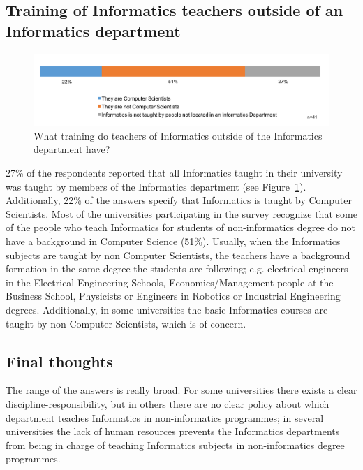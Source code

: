 \subsection{Training of Informatics teachers outside of an Informatics department}

\begin{figure}[h]
\includegraphics[width = \linewidth]{charts/2d.png}
\caption{What training do teachers of Informatics outside of the Informatics department have?}
\label{sect3:whoteaches}
\end{figure}
27\% of the respondents reported that all Informatics taught in their university was taught by members of the Informatics department (see Figure~\ref{sect3:whoteaches}).
Additionally, 22\% of the answers specify that Informatics is taught by Computer Scientists. 
Most of the universities participating in the survey recognize that some of the people who teach Informatics for students of non-informatics degree do not have a background in Computer Science (51\%). Usually, when the Informatics subjects are  taught by non Computer Scientists, the teachers have a background formation in the same degree the students are following; e.g. electrical engineers in the Electrical Engineering Schools, Economics/Management people at the Business School, Physicists or Engineers in Robotics or Industrial Engineering degrees. Additionally, in some universities the basic Informatics courses  are taught by non Computer Scientists, which is of concern.


\subsection{Final thoughts}

The range of the answers is really broad. For some universities there exists a clear discipline-responsibility, but in others there are no clear policy about which department teaches Informatics in non-informatics programmes; in several universities the lack of human resources prevents the Informatics departments from being in charge of teaching Informatics subjects in non-informatics degree programmes.

